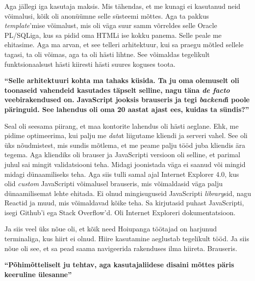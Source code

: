 Aga jällegi iga kasutaja maksis. Mis tähendas, et me kunagi ei kasutanud neid
võimalusi, kõik oli anonüümne selle süsteemi mõttes. Aga ta pakkus
\emph{template}'mise võimalust, mis oli väga suur samm võrreldes selle Oracle
PL/SQLiga, kus sa pidid oma HTMLi ise kokku panema. Selle peale me ehitasime.
Aga ma arvan, et see telleri arhitektuur, kui sa praegu mõtled sellele tagasi,
ta oli võimas, aga ta oli hästi lihtne. See võimaldas tegelikult
funktsionaalsust hästi kiiresti hästi suures koguses toota.

\textbf{\enquote{Selle arhitektuuri kohta ma tahaks küsida. Ta ju oma olemuselt
oli toonaseid vahendeid kasutades täpselt selline, nagu täna \emph{de facto}
veebirakendused on. JavaScript jooksis brauseris ja
tegi \emph{backend}i poole päringuid. See lahendus oli oma 20 aastat ajast ees,
kuidas ta sündis?}}

Seal oli seesama piirang, et maa kontorite lahendus oli hästi aeglane. Ehk, me
pidime optimeerima, kui palju me \emph{data}t liigutame kliendi ja serveri
vahel. See oli üks nõudmistest, mis sundis mõtlema, et me peame palju tööd juba
kliendis ära tegema. Aga kliendiks oli brauser ja JavaScripti versioon oli
selline, et parimal juhul sai mingit validatsiooni teha. Midagi joonistada väga
ei saanud või mingid midagi dünaamiliseks teha. Aga siis tulli samal ajal
Internet Explorer 4.0, kus olid \emph{custom}
JavaScripti võimalusel brauseris, mis võimaldasid väga palju dünaamilisemat
lehte ehitada. Ei olnud mingisuguseid JavaScripti \emph{library}sid, nagu
Reactid ja muud, mis võimaldavad kõike teha. Sa kirjutasid puhast
JavaScripti, isegi Github'i ega Stack Overflow'd. Oli Internet Exploreri
dokumentatsioon.

Ja siis veel üks nõue oli, et kõik need Hoiupanga töötajad on harjunud
terminaliga, kus hiirt ei olnud. Hiire kasutamine aeglustab tegelikult tööd.
Ja siis nõue oli see, et sa pead saama navigeerida rakenduses ilma hiireta.
Brauseris. 

\textbf{\enquote{Põhimõtteliselt ju tehtav, aga kasutajaliidese disaini mõttes
päris keeruline ülesanne}}

